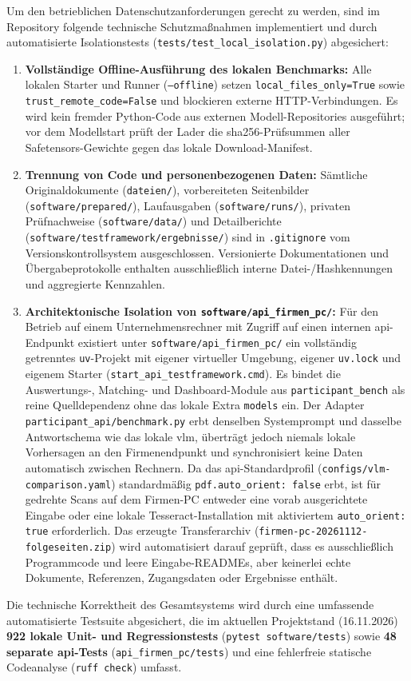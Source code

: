 Um den betrieblichen Datenschutzanforderungen gerecht zu werden, sind im Repository folgende technische Schutzmaßnahmen implementiert und durch automatisierte Isolationstests (\texttt{tests/test\_local\_isolation.py}) abgesichert:
\begin{enumerate}
  \item \textbf{Vollständige Offline-Ausführung des lokalen Benchmarks:} Alle lokalen Starter und Runner (\texttt{--offline}) setzen \texttt{local\_files\_only=True} sowie \texttt{trust\_remote\_code=False} und blockieren externe HTTP-Verbindungen. Es wird kein fremder Python-Code aus externen Modell-Repositories ausgeführt; vor dem Modellstart prüft der Lader die \ac{sha256}-Prüfsummen aller Safetensors-Gewichte gegen das lokale Download-Manifest.
  \item \textbf{Trennung von Code und personenbezogenen Daten:} Sämtliche Originaldokumente (\texttt{dateien/}), vorbereiteten Seitenbilder (\texttt{software/prepared/}), Laufausgaben (\texttt{software/runs/}), privaten Prüfnachweise (\texttt{software/data/}) und Detailberichte (\texttt{software/testframework/ergebnisse/}) sind in \texttt{.gitignore} vom Versionskontrollsystem ausgeschlossen. Versionierte Dokumentationen und Übergabeprotokolle enthalten ausschließlich interne Datei-/Hashkennungen und aggregierte Kennzahlen.
  \item \textbf{Architektonische Isolation von \texttt{software/api\_firmen\_pc/}:} Für den Betrieb auf einem Unternehmensrechner mit Zugriff auf einen internen \ac{api}-Endpunkt existiert unter \texttt{software/api\_firmen\_pc/} ein vollständig getrenntes \texttt{uv}-Projekt mit eigener virtueller Umgebung, eigener \texttt{uv.lock} und eigenem Starter (\texttt{start\_api\_testframework.cmd}). Es bindet die Auswertungs-, Matching- und Dashboard-Module aus \texttt{participant\_bench} als reine Quelldependenz ohne das lokale Extra \texttt{models} ein. Der Adapter \texttt{participant\_api/benchmark.py} erbt denselben Systemprompt und dasselbe Antwortschema wie das lokale \ac{vlm}, überträgt jedoch niemals lokale Vorhersagen an den Firmenendpunkt und synchronisiert keine Daten automatisch zwischen Rechnern. Da das \ac{api}-Standardprofil (\texttt{configs/vlm-comparison.yaml}) standardmäßig \texttt{pdf.auto\_orient: false} erbt, ist für gedrehte Scans auf dem Firmen-PC entweder eine vorab ausgerichtete Eingabe oder eine lokale Tesseract-Installation mit aktiviertem \texttt{auto\_orient: true} erforderlich. Das erzeugte Transferarchiv (\texttt{firmen-pc-20261112-folgeseiten.zip}) wird automatisiert darauf geprüft, dass es ausschließlich Programmcode und leere Eingabe-READMEs, aber keinerlei echte Dokumente, Referenzen, Zugangsdaten oder Ergebnisse enthält.
\end{enumerate}

Die technische Korrektheit des Gesamtsystems wird durch eine umfassende automatisierte Testsuite abgesichert, die im aktuellen Projektstand (16.11.2026) \textbf{922 lokale Unit- und Regressionstests} (\texttt{pytest software/tests}) sowie \textbf{48 separate \ac{api}-Tests} (\texttt{api\_firmen\_pc/tests}) und eine fehlerfreie statische Codeanalyse (\texttt{ruff check}) umfasst.
